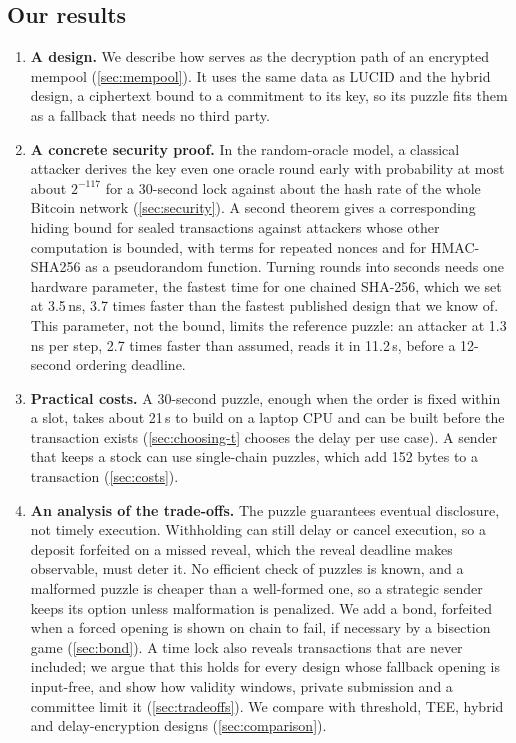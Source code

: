 \subsection{Our results}\label{sec:results}
\begin{enumerate}[label=\arabic*.,leftmargin=1.5em]
  \item \textbf{A design.} We describe how \leanseal serves as the decryption path of an encrypted mempool (\cref{sec:mempool}). It uses the same data as LUCID and the hybrid design, a ciphertext bound to a commitment to its key, so its puzzle fits them as a fallback that needs no third party.
  \item \textbf{A concrete security proof.} In the random-oracle model, a classical attacker derives the key even one oracle round early with probability at most about $2^{-117}$ for a 30-second lock against about the hash rate of the whole Bitcoin network (\cref{sec:security}). A second theorem gives a corresponding hiding bound for sealed transactions against attackers whose other computation is bounded, with terms for repeated nonces and for HMAC-SHA256 as a pseudorandom function. Turning rounds into seconds needs one hardware parameter, the fastest time for one chained SHA-256, which we set at 3.5\,ns, 3.7 times faster than the fastest published design that we know of. This parameter, not the bound, limits the reference puzzle: an attacker at 1.3\,ns per step, 2.7 times faster than assumed, reads it in 11.2\,s, before a 12-second ordering deadline.
  \item \textbf{Practical costs.} A 30-second puzzle, enough when the order is fixed within a slot, takes about 21\,s to build on a laptop CPU and can be built before the transaction exists (\cref{sec:choosing-t} chooses the delay per use case). A sender that keeps a stock can use single-chain puzzles, which add 152 bytes to a transaction (\cref{sec:costs}).
  \item \textbf{An analysis of the trade-offs.} The puzzle guarantees eventual disclosure, not timely execution. Withholding can still delay or cancel execution, so a deposit forfeited on a missed reveal, which the reveal deadline makes observable, must deter it. No efficient check of puzzles is known, and a malformed puzzle is cheaper than a well-formed one, so a strategic sender keeps its option unless malformation is penalized. We add a bond, forfeited when a forced opening is shown on chain to fail, if necessary by a bisection game (\cref{sec:bond}). A time lock also reveals transactions that are never included; we argue that this holds for every design whose fallback opening is input-free, and show how validity windows, private submission and a committee limit it (\cref{sec:tradeoffs}). We compare \leanseal with threshold, TEE, hybrid and delay-encryption designs (\cref{sec:comparison}).

\end{enumerate}
